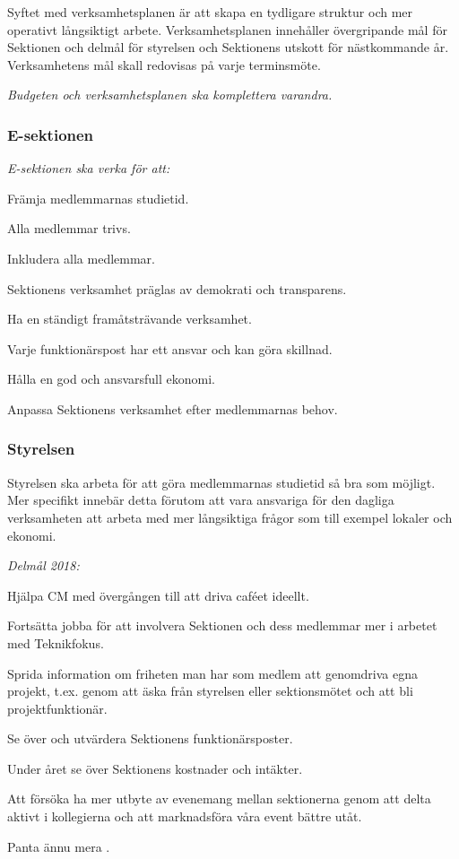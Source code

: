 \documentclass[../_main/handlingar.tex]{subfiles}
\begin{document}
Syftet med verksamhetsplanen är att skapa en tydligare struktur och mer operativt långsiktigt arbete. Verksamhetsplanen innehåller övergripande mål för Sektionen och delmål för styrelsen och Sektionens utskott för nästkommande år. Verksamhetens mål skall redovisas på varje terminsmöte.

\emph{Budgeten och verksamhetsplanen ska komplettera varandra.}

\subsubsection*{E-sektionen}
\emph{E-sektionen ska verka för att:}
\begin{dashlist}
	\item Främja medlemmarnas studietid.
	\item Alla medlemmar trivs.
	\item Inkludera alla medlemmar.
	\item Sektionens verksamhet präglas av demokrati och transparens.
	\item Ha en ständigt framåtsträvande verksamhet.
	\item Varje funktionärspost har ett ansvar och kan göra skillnad.
	\item Hålla en god och ansvarsfull ekonomi.
	\item Anpassa Sektionens verksamhet efter medlemmarnas behov.
\end{dashlist}

\subsubsection*{Styrelsen}
Styrelsen ska arbeta för att göra medlemmarnas studietid så bra som möjligt. Mer specifikt innebär detta förutom att vara ansvariga för den dagliga verksamheten att arbeta med mer långsiktiga frågor som till exempel lokaler och ekonomi.

\emph{Delmål 2018:}
\begin{dashlist}
	\item Hjälpa CM med övergången till att driva caféet ideellt.
	\item Fortsätta jobba för att involvera Sektionen och dess medlemmar mer i arbetet med Teknikfokus.
	\item Sprida information om friheten man har som medlem att genomdriva egna projekt, t.ex. genom att äska från styrelsen eller sektionsmötet och att bli projektfunktionär.
	\item Se över och utvärdera Sektionens funktionärsposter.
	\item Under året se över Sektionens kostnader och intäkter.
	\item Att försöka ha mer utbyte av evenemang mellan sektionerna genom att delta aktivt i kollegierna och att marknadsföra våra event bättre utåt.
	\item Panta ännu mera \scalebox{0.4}{\recycle}.
\end{dashlist}
\newpage
\end{document}
